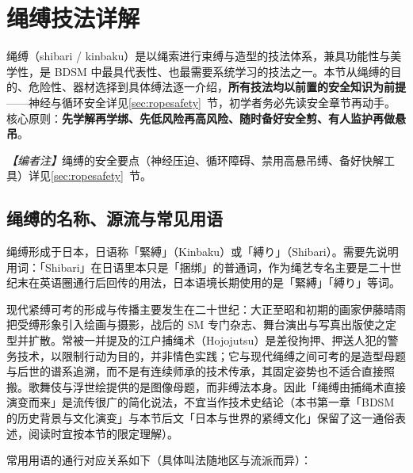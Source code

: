 \documentclass[12pt,UTF8]{ctexbook}
\begin{document}
\section{绳缚技法详解}\label{sec:shibari}

绳缚（shibari / kinbaku）是以绳索进行束缚与造型的技法体系，兼具功能性与美学性，是 BDSM 中最具代表性、也最需要系统学习的技法之一。本节从绳缚的目的、危险性、器材选择到具体缚法逐一介绍，\textbf{所有技法均以前置的安全知识为前提}——神经与循环安全详见\ref{sec:ropesafety}~节，初学者务必先读安全章节再动手。核心原则：\textbf{先学解再学绑、先低风险再高风险、随时备好安全剪、有人监护再做悬吊}。

\noindent\textit{【编者注】}绳缚的安全要点（神经压迫、循环障碍、禁用高悬吊缚、备好快解工具）详见\ref{sec:ropesafety}~节。

\subsection{绳缚的名称、源流与常见用语}\label{sec:ropeterms}

绳缚形成于日本，日语称「緊縛」（Kinbaku）或「縛り」（Shibari）。需要先说明用词：「Shibari」在日语里本只是「捆绑」的普通词，作为绳艺专名主要是二十世纪末在英语圈通行后回传的用法，日本语境长期使用的是「緊縛」「縛り」等词。

现代紧缚可考的形成与传播主要发生在二十世纪：大正至昭和初期的画家伊藤晴雨把受缚形象引入绘画与摄影，战后的 SM 专门杂志、舞台演出与写真出版使之定型并扩散。常被一并提及的江户捕绳术（Hojojutsu）是差役拘押、押送人犯的警务技术，以限制行动为目的，并非情色实践；它与现代绳缚之间可考的是造型母题与后世的谱系追溯，而不是有连续师承的技术传承，其固定姿势也不适合直接照搬。歌舞伎与浮世绘提供的是图像母题，而非缚法本身。因此「绳缚由捕绳术直接演变而来」是流传很广的简化说法，不宜当作技术史结论（本书第一章「BDSM 的历史背景与文化演变」与本节后文「日本与世界的紧缚文化」保留了这一通俗表述，阅读时宜按本节的限定理解）。

常用用语的通行对应关系如下（具体叫法随地区与流派而异）：
\end{document}

